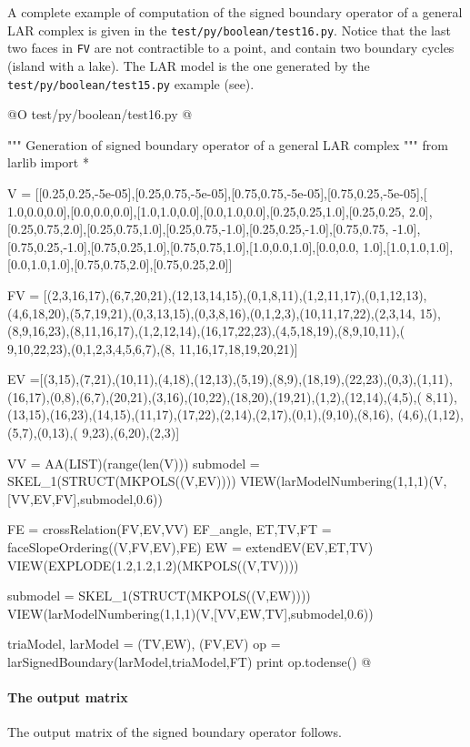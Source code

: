 \documentclass[11pt,oneside]{article}    %
\begin{document}
A complete example of computation of the signed boundary operator of a general LAR complex is given in the \texttt{test/py/boolean/test16.py}. Notice that the last two faces in \texttt{FV} are not contractible to a point, and contain two boundary cycles (island with a lake). The LAR model is the one generated by the \texttt{test/py/boolean/test15.py} example (see).

@O test/py/boolean/test16.py
@{""" Generation of signed boundary operator of a general LAR complex """
from larlib import *

V = [[0.25,0.25,-5e-05],[0.25,0.75,-5e-05],[0.75,0.75,-5e-05],[0.75,0.25,-5e-05],[
1.0,0.0,0.0],[0.0,0.0,0.0],[1.0,1.0,0.0],[0.0,1.0,0.0],[0.25,0.25,1.0],[0.25,0.25,
2.0],[0.25,0.75,2.0],[0.25,0.75,1.0],[0.25,0.75,-1.0],[0.25,0.25,-1.0],[0.75,0.75,
-1.0],[0.75,0.25,-1.0],[0.75,0.25,1.0],[0.75,0.75,1.0],[1.0,0.0,1.0],[0.0,0.0,
1.0],[1.0,1.0,1.0],[0.0,1.0,1.0],[0.75,0.75,2.0],[0.75,0.25,2.0]]

FV = [(2,3,16,17),(6,7,20,21),(12,13,14,15),(0,1,8,11),(1,2,11,17),(0,1,12,13),
(4,6,18,20),(5,7,19,21),(0,3,13,15),(0,3,8,16),(0,1,2,3),(10,11,17,22),(2,3,14,
15),(8,9,16,23),(8,11,16,17),(1,2,12,14),(16,17,22,23),(4,5,18,19),(8,9,10,11),(
9,10,22,23),(0,1,2,3,4,5,6,7),(8, 11,16,17,18,19,20,21)]

EV =[(3,15),(7,21),(10,11),(4,18),(12,13),(5,19),(8,9),(18,19),(22,23),(0,3),(1,11),
(16,17),(0,8),(6,7),(20,21),(3,16),(10,22),(18,20),(19,21),(1,2),(12,14),(4,5),(
8,11),(13,15),(16,23),(14,15),(11,17),(17,22),(2,14),(2,17),(0,1),(9,10),(8,16),
(4,6),(1,12),(5,7),(0,13),( 9,23),(6,20),(2,3)]

VV = AA(LIST)(range(len(V)))
submodel = SKEL_1(STRUCT(MKPOLS((V,EV))))
VIEW(larModelNumbering(1,1,1)(V,[VV,EV,FV],submodel,0.6))

FE = crossRelation(FV,EV,VV)
EF_angle, ET,TV,FT = faceSlopeOrdering((V,FV,EV),FE)
EW = extendEV(EV,ET,TV)
VIEW(EXPLODE(1.2,1.2,1.2)(MKPOLS((V,TV))))
            
submodel = SKEL_1(STRUCT(MKPOLS((V,EW))))
VIEW(larModelNumbering(1,1,1)(V,[VV,EW,TV],submodel,0.6))

triaModel, larModel = (TV,EW), (FV,EV)
op = larSignedBoundary(larModel,triaModel,FT)
print op.todense()
@}

\paragraph{The output matrix}
The output matrix of the signed boundary operator follows.
\end{document}
